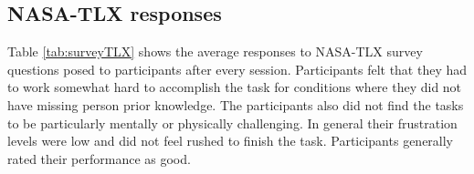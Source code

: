 \documentclass{article}
\begin{document}
\subsection{NASA-TLX responses}
\begin{table}[H]
	\centering
	\caption{NASA-TLX responses on a 0--20 scale across different conditions}
	\label{tab:surveyTLX}%
\end{table}%
Table \ref{tab:surveyTLX} shows the average responses to NASA-TLX survey questions posed to participants after every session. Participants felt that they had to work somewhat hard to accomplish the task for conditions where they did not have missing person prior knowledge. The participants also did not find the tasks to be particularly mentally or physically challenging. In general their frustration levels were low and did not feel rushed to finish the task. Participants generally rated their performance as good.
\end{document}
